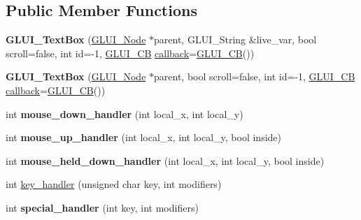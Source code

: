 \subsection*{Public Member Functions}
\begin{DoxyCompactItemize}
\item 
\hypertarget{classGLUI__TextBox_a2973d6ed429cb52fc794273939fbbcdb}{{\bfseries G\-L\-U\-I\-\_\-\-Text\-Box} (\hyperlink{classGLUI__Node}{G\-L\-U\-I\-\_\-\-Node} $\ast$parent, G\-L\-U\-I\-\_\-\-String \&live\-\_\-var, bool scroll=false, int id=-\/1, \hyperlink{classGLUI__CB}{G\-L\-U\-I\-\_\-\-C\-B} \hyperlink{classGLUI__Control_a96060fe0cc6d537e736dd6eef78e24ab}{callback}=\hyperlink{classGLUI__CB}{G\-L\-U\-I\-\_\-\-C\-B}())}\label{classGLUI__TextBox_a2973d6ed429cb52fc794273939fbbcdb}

\item 
\hypertarget{classGLUI__TextBox_a91e7c9fcb2f00ac68e9d10dcb9a09769}{{\bfseries G\-L\-U\-I\-\_\-\-Text\-Box} (\hyperlink{classGLUI__Node}{G\-L\-U\-I\-\_\-\-Node} $\ast$parent, bool scroll=false, int id=-\/1, \hyperlink{classGLUI__CB}{G\-L\-U\-I\-\_\-\-C\-B} \hyperlink{classGLUI__Control_a96060fe0cc6d537e736dd6eef78e24ab}{callback}=\hyperlink{classGLUI__CB}{G\-L\-U\-I\-\_\-\-C\-B}())}\label{classGLUI__TextBox_a91e7c9fcb2f00ac68e9d10dcb9a09769}

\item 
\hypertarget{classGLUI__TextBox_a193bf66dde6e93a501af7a04dd57fec3}{int {\bfseries mouse\-\_\-down\-\_\-handler} (int local\-\_\-x, int local\-\_\-y)}\label{classGLUI__TextBox_a193bf66dde6e93a501af7a04dd57fec3}

\item 
\hypertarget{classGLUI__TextBox_ae2ec21715ffdacd73497acc91444a637}{int {\bfseries mouse\-\_\-up\-\_\-handler} (int local\-\_\-x, int local\-\_\-y, bool inside)}\label{classGLUI__TextBox_ae2ec21715ffdacd73497acc91444a637}

\item 
\hypertarget{classGLUI__TextBox_a825107a1c8c86b3a6327f62e634e8a4e}{int {\bfseries mouse\-\_\-held\-\_\-down\-\_\-handler} (int local\-\_\-x, int local\-\_\-y, bool inside)}\label{classGLUI__TextBox_a825107a1c8c86b3a6327f62e634e8a4e}

\item 
int \hyperlink{classGLUI__TextBox_acdb3ac37acc3c3ba6260ea73f413257f}{key\-\_\-handler} (unsigned char key, int modifiers)
\item 
\hypertarget{classGLUI__TextBox_a2fa1ab2b0026f6eeea9a4e25107637f0}{int {\bfseries special\-\_\-handler} (int key, int modifiers)}\label{classGLUI__TextBox_a2fa1ab2b0026f6eeea9a4e25107637f0}


\end{DoxyCompactItemize}
